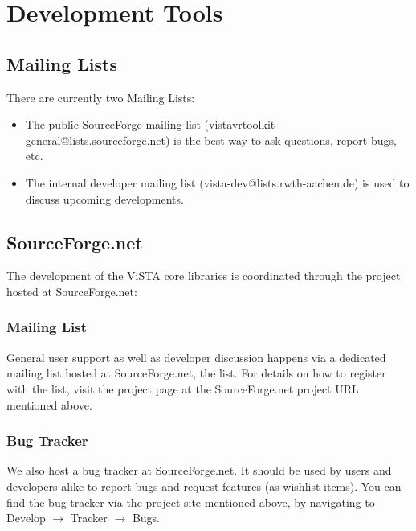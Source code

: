 


\section{Development Tools}

\subsection{Mailing Lists}
There are currently two Mailing Lists:
\begin{itemize}
	\item The public SourceForge mailing list (vistavrtoolkit-general@lists.sourceforge.net) is the best way to ask questions, report bugs, etc.
	\item The internal developer mailing list (vista-dev@lists.rwth-aachen.de) is used to discuss upcoming developments.
\end{itemize}

\subsection{SourceForge.net}
The development of the ViSTA core libraries is coordinated through the  project hosted at SourceForge.net:


\subsubsection{Mailing List}
General user support as well as developer discussion happens via a dedicated mailing list hosted at SourceForge.net, the  list.
For details on how to register with the list, visit the  project page at the SourceForge.net project URL mentioned above.

\subsubsection{Bug Tracker}
We also host a bug tracker at SourceForge.net. 
It should be used by users and developers alike to report bugs and request features (as wishlist items).
You can find the bug tracker via the project site mentioned above, by navigating to Develop $\rightarrow$ Tracker $\rightarrow$ Bugs.

